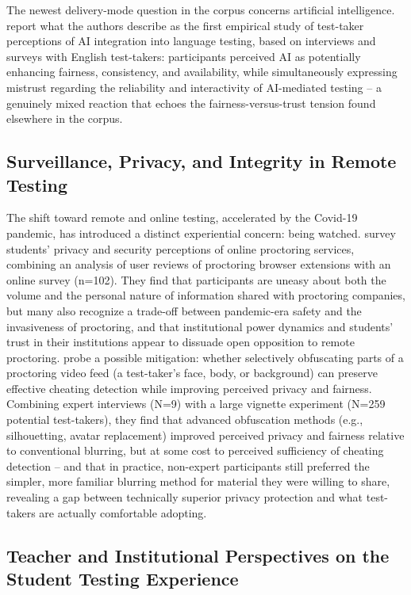 \documentclass[11pt]{article}
\begin{document}
The newest delivery-mode question in the corpus concerns artificial intelligence. \citet{zhang2023testtakers} report what the authors describe as the first empirical study of test-taker perceptions of AI integration into language testing, based on interviews and surveys with English test-takers: participants perceived AI as potentially enhancing fairness, consistency, and availability, while simultaneously expressing mistrust regarding the reliability and interactivity of AI-mediated testing -- a genuinely mixed reaction that echoes the fairness-versus-trust tension found elsewhere in the corpus.

\subsection{Surveillance, Privacy, and Integrity in Remote Testing}

The shift toward remote and online testing, accelerated by the Covid-19 pandemic, has introduced a distinct experiential concern: being watched. \citet{balash2021examiners} survey students' privacy and security perceptions of online proctoring services, combining an analysis of user reviews of proctoring browser extensions with an online survey (n=102). They find that participants are uneasy about both the volume and the personal nature of information shared with proctoring companies, but many also recognize a trade-off between pandemic-era safety and the invasiveness of proctoring, and that institutional power dynamics and students' trust in their institutions appear to dissuade open opposition to remote proctoring. \citet{mukherjee2024proctoring} probe a possible mitigation: whether selectively obfuscating parts of a proctoring video feed (a test-taker's face, body, or background) can preserve effective cheating detection while improving perceived privacy and fairness. Combining expert interviews (N=9) with a large vignette experiment (N=259 potential test-takers), they find that advanced obfuscation methods (e.g., silhouetting, avatar replacement) improved perceived privacy and fairness relative to conventional blurring, but at some cost to perceived sufficiency of cheating detection -- and that in practice, non-expert participants still preferred the simpler, more familiar blurring method for material they were willing to share, revealing a gap between technically superior privacy protection and what test-takers are actually comfortable adopting.

\subsection{Teacher and Institutional Perspectives on the Student Testing Experience}
\label{sec:teacherperspectives}
\end{document}
